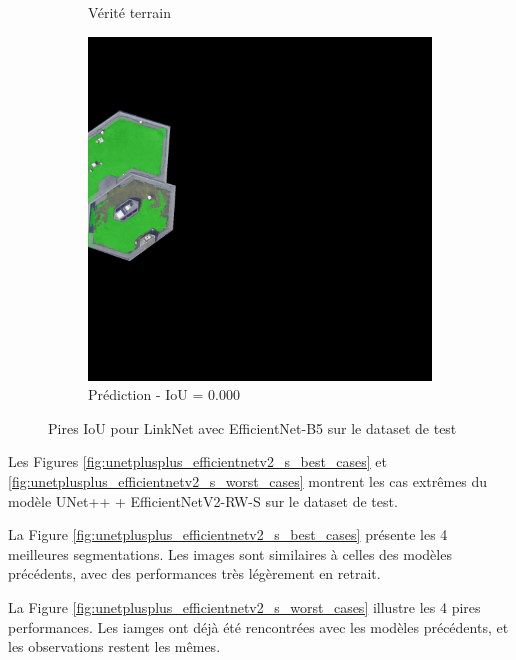 \begin{figure}[H]
\begin{subfigure}{0.32\textwidth}
    \caption{Vérité terrain}
\end{subfigure}
\hfill
\begin{subfigure}{0.32\textwidth}
    \includegraphics[width=\textwidth]{02-main//figures/ch4/kfold_ensembles/linknet_timm-efficientnet-b5/worst_cases/worst_2_iou0.000_25001117_tile_3_9_5ba8f7_overlay_pred.png}
    \caption{Prédiction - IoU = 0.000}
\end{subfigure}

\caption{Pires IoU pour LinkNet avec EfficientNet-B5 sur le dataset de test}
\label{fig:linknet_efficientnet_b5_worst_cases}
\end{figure}


Les Figures \ref{fig:unetplusplus_efficientnetv2_s_best_cases} et \ref{fig:unetplusplus_efficientnetv2_s_worst_cases} montrent les cas extrêmes du modèle UNet++ + EfficientNetV2-RW-S sur le dataset de test.

La Figure \ref{fig:unetplusplus_efficientnetv2_s_best_cases} présente les 4 meilleures segmentations. Les images sont similaires à celles des modèles précédents, avec des performances très légèrement en retrait.

La Figure \ref{fig:unetplusplus_efficientnetv2_s_worst_cases} illustre les 4 pires performances. Les iamges ont déjà été rencontrées avec les modèles précédents, et les observations restent les mêmes.

